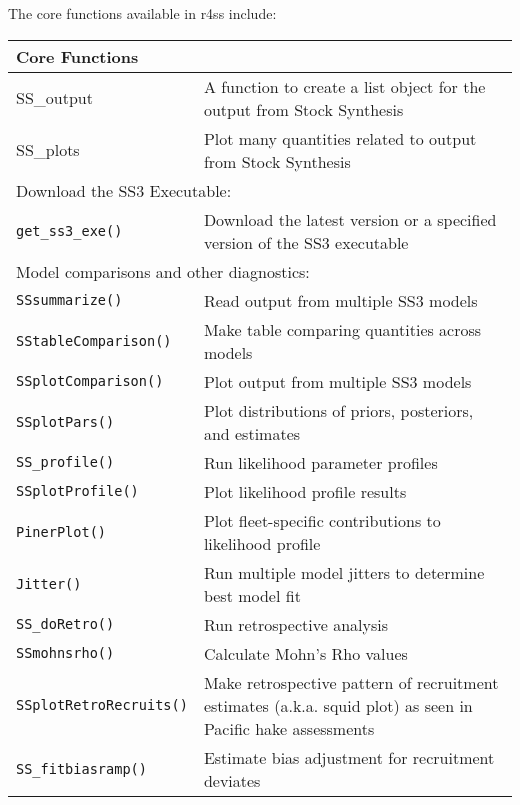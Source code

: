 The core functions available in \gls{r4ss} include:
\begin{center}
	\begin{longtable}{p{4.5cm} p{10.52cm}}
		\hline
		Core Functions & \Tstrut\Bstrut\\
		\hline
		SS\_output \Tstrut & A function to create a list object for the output from Stock Synthesis \\
		SS\_plots  \Tstrut & Plot many quantities related to output from Stock Synthesis \\
		\hline
		
		\multicolumn{2}{l}{Download the SS3 Executable:} \Tstrut\Bstrut\\
		\hline
		\texttt{get\_ss3\_exe()} \Tstrut & Download the latest version or a specified version of the SS3 executable \\
		\hline
	
		\multicolumn{2}{l}{Model comparisons and other diagnostics:} \Tstrut\Bstrut\\
		\hline
		\texttt{SSsummarize()} \Tstrut & Read output from multiple SS3 models \\
		\texttt{SStableComparison()} \Tstrut & Make table comparing quantities across models \\
		\texttt{SSplotComparison()} \Tstrut & Plot output from multiple SS3 models \\
		\texttt{SSplotPars()} \Tstrut & Plot distributions of priors, posteriors, and estimates \\
		\texttt{SS\_profile()} \Tstrut & Run likelihood parameter profiles \\
		\texttt{SSplotProfile()} \Tstrut & Plot likelihood profile results \\
		\texttt{PinerPlot()} \Tstrut & Plot fleet-specific contributions to likelihood profile \\
		\texttt{Jitter()} \Tstrut & Run multiple model jitters to determine best model fit \\
		\texttt{SS\_doRetro()} \Tstrut & Run retrospective analysis \\
		\texttt{SSmohnsrho()} \Tstrut & Calculate Mohn's Rho values \\
		\texttt{SSplotRetroRecruits()} \Tstrut & Make retrospective pattern of recruitment estimates (a.k.a. squid plot) as seen in Pacific hake assessments\Bstrut \\
		\texttt{SS\_fitbiasramp()} \Tstrut & Estimate bias adjustment for recruitment deviates \Bstrut\\
		\hline
		

\end{longtable}
\end{center}
